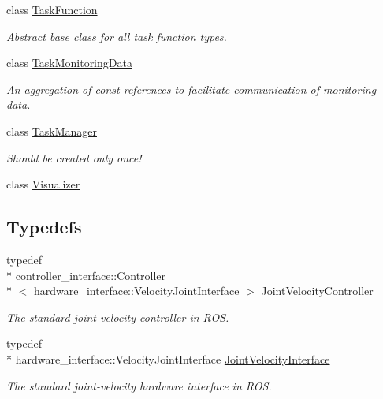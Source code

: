 \begin{DoxyCompactItemize}
class \hyperlink{classhiqp_1_1TaskFunction}{Task\-Function}
\begin{DoxyCompactList}\small\item\em Abstract base class for all task function types. \end{DoxyCompactList}\item 
class \hyperlink{classhiqp_1_1TaskMonitoringData}{Task\-Monitoring\-Data}
\begin{DoxyCompactList}\small\item\em An aggregation of const references to facilitate communication of monitoring data. \end{DoxyCompactList}\item 
class \hyperlink{classhiqp_1_1TaskManager}{Task\-Manager}
\begin{DoxyCompactList}\small\item\em Should be created only once! \end{DoxyCompactList}\item 
class \hyperlink{classhiqp_1_1Visualizer}{Visualizer}
\end{DoxyCompactItemize}
\subsection*{Typedefs}
\begin{DoxyCompactItemize}
\item 
\hypertarget{namespacehiqp_a7b250295f6797153486ce8ab085bd450}{typedef \\*
controller\-\_\-interface\-::\-Controller\\*
$<$ hardware\-\_\-interface\-::\-Velocity\-Joint\-Interface $>$ \hyperlink{namespacehiqp_a7b250295f6797153486ce8ab085bd450}{Joint\-Velocity\-Controller}}\label{namespacehiqp_a7b250295f6797153486ce8ab085bd450}

\begin{DoxyCompactList}\small\item\em The standard joint-\/velocity-\/controller in R\-O\-S. \end{DoxyCompactList}\item 
\hypertarget{namespacehiqp_ac536ca3b4ba33489281fa5bec490799c}{typedef \\*
hardware\-\_\-interface\-::\-Velocity\-Joint\-Interface \hyperlink{namespacehiqp_ac536ca3b4ba33489281fa5bec490799c}{Joint\-Velocity\-Interface}}\label{namespacehiqp_ac536ca3b4ba33489281fa5bec490799c}

\begin{DoxyCompactList}\small\item\em The standard joint-\/velocity hardware interface in R\-O\-S. \end{DoxyCompactList}\end{DoxyCompactItemize}
